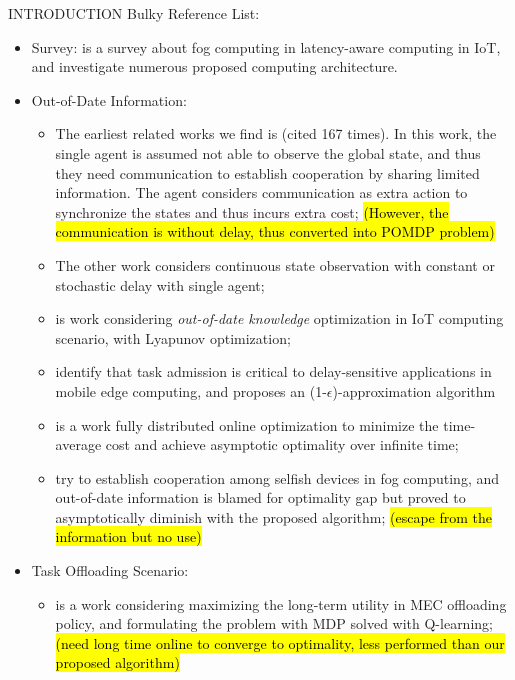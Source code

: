 \documentclass[10pt, conference, letterpaper]{IEEEtran}
\begin{document}
\begin{section}{INTRODUCTION}
        Bulky Reference List:
        \begin{itemize}
            \item Survey: \cite{Naha2018} is a survey about fog computing in latency-aware computing in IoT, and investigate numerous proposed computing architecture.
            \item Out-of-Date Information:
                \begin{itemize}
                    \item The earliest related works we find is \cite{ref-01} (cited 167 times). In this work, the single agent is assumed not able to observe the global state, and thus they need communication to establish cooperation by sharing limited information. The agent considers communication as extra action to synchronize the states and thus incurs extra cost; \hl{(However, the communication is without delay, thus converted into POMDP problem)}
                    \item The other work \cite{ref-02} considers continuous state observation with constant or stochastic delay with single agent;
                    \item \cite{Lyu2017} is work considering \emph{out-of-date knowledge} optimization in IoT computing scenario, with Lyapunov optimization;
                    \item {} \cite{Lyu2018} identify that task admission is critical to delay-sensitive applications in mobile edge computing, and proposes an (1-$\epsilon$)-approximation algorithm
                    \item {} \cite{Lyu2018a} is a work fully distributed online optimization to minimize the time-average cost and achieve asymptotic optimality over infinite time;
                    \item \cite{Lyu2018b} try to establish cooperation among selfish devices in fog computing, and out-of-date information is blamed for optimality gap but proved to asymptotically diminish with the proposed algorithm; \hl{(escape from the information but no use)}
                \end{itemize}
            \item Task Offloading Scenario:
                \begin{itemize}
                    \item {} \cite{Zheng2019} is a work considering maximizing the long-term utility in MEC offloading policy, and formulating the problem with MDP solved with Q-learning; \hl{(need long time online to converge to optimality, less performed than our proposed algorithm)}

\end{itemize}
\end{itemize}
\end{section}
\end{document}
